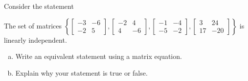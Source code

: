 
\begin{exerciseStatement}


Consider the statement 
\begin{center}\begin{minipage}{0.8\textwidth}
 The set of matrices \( \left\{ \left[\begin{array}{cc}
-3 & -6 \\
-2 & 5
\end{array}\right] , \left[\begin{array}{cc}
-2 & 4 \\
4 & -6
\end{array}\right] , \left[\begin{array}{cc}
-1 & -4 \\
-5 & -2
\end{array}\right] , \left[\begin{array}{cc}
3 & 24 \\
17 & -20
\end{array}\right] \right\} \) is linearly independent.
\end{minipage}\end{center}
    


\begin{enumerate}[(a)]
\item  Write an equivalent statement using a matrix equation.
\item  Explain why your statement is true or false.
\end{enumerate}
    
\end{exerciseStatement}
    
